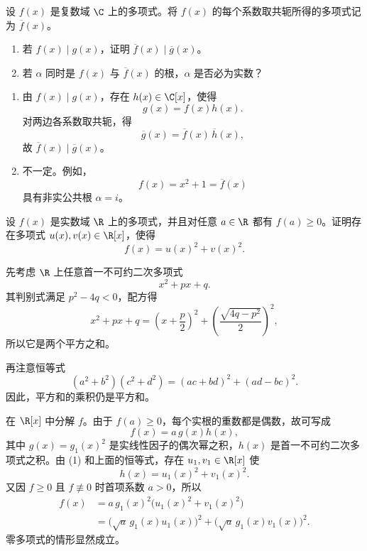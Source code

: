 \begin{problem}
 设 \(f(x)\) 是复数域 \(\C\) 上的多项式。将 \(f(x)\) 的每个系数取共轭所得的多项式记为 \(\overline{f}(x)\)。
	\begin{enumerate}
		\item 若 \(f(x)\mid g(x)\)，证明 \(\overline{f}(x)\mid\overline{g}(x)\)。
		\item 若 \(\alpha\) 同时是 \(f(x)\) 与 \(\overline{f}(x)\) 的根，\(\alpha\) 是否必为实数？
	\end{enumerate}
\end{problem}

\begin{solution}
	\begin{enumerate}
		\item 由 \(f(x)\mid g(x)\)，存在 \(h(x)\in\C[x]\)，使得
		\[
		g(x)=f(x)h(x).
		\]
		对两边各系数取共轭，得
		\[
		\overline{g}(x)=\overline{f}(x)\,\overline{h}(x),
		\]
		故 \(\overline{f}(x)\mid\overline{g}(x)\)。
		
		\item 不一定。例如，
		\[
		f(x)=x^2+1=\overline{f}(x)
		\]
		具有非实公共根 \(\alpha=i\)。
	\end{enumerate}
\end{solution}

\begin{problem}
	 设 \(f(x)\) 是实数域 \(\R\) 上的多项式，并且对任意 \(a\in\R\) 都有 \(f(a)\ge0\)。证明存在多项式 \(u(x),v(x)\in\R[x]\)，使得
	\[
	f(x)=u(x)^2+v(x)^2.
	\]
\end{problem}

\begin{solution}
	先考虑 \(\R\) 上任意首一不可约二次多项式
	\[
	x^2+px+q.
	\]
	其判别式满足 \(p^2-4q<0\)，配方得
	\begin{equation}
		x^2+px+q
		=\left(x+\frac p2\right)^2
		+\left(\frac{\sqrt{4q-p^2}}2\right)^2,
		\tag{1}
	\end{equation}
	所以它是两个平方之和。
	
	再注意恒等式
	\[
	(a^2+b^2)(c^2+d^2)=(ac+bd)^2+(ad-bc)^2.
	\]
	因此，平方和的乘积仍是平方和。
	
	在 \(\R[x]\) 中分解 \(f\)。由于 \(f(a)\ge0\)，每个实根的重数都是偶数，故可写成
	\[
	f(x)=a\,g(x)h(x),
	\]
	其中 \(g(x)=g_1(x)^2\) 是实线性因子的偶次幂之积，\(h(x)\) 是首一不可约二次多项式之积。由 (1) 和上面的恒等式，存在 \(u_1,v_1\in\R[x]\) 使
	\[
	h(x)=u_1(x)^2+v_1(x)^2.
	\]
	又因 \(f\ge0\) 且 \(f\not\equiv0\) 时首项系数 \(a>0\)，所以
	\[
	\begin{aligned}
		f(x)
		&=a\,g_1(x)^2\bigl(u_1(x)^2+v_1(x)^2\bigr)\\
		&=\bigl(\sqrt a\,g_1(x)u_1(x)\bigr)^2
		+\bigl(\sqrt a\,g_1(x)v_1(x)\bigr)^2.
	\end{aligned}
	\]
	零多项式的情形显然成立。
\end{solution}

